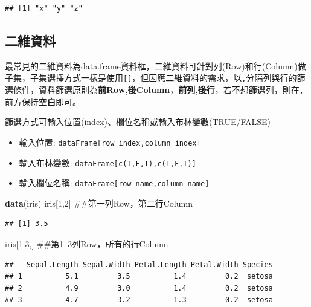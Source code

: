\documentclass[]{book}
\newenvironment{Shaded}{\begin{snugshade}}{\end{snugshade}}
\newcommand{\KeywordTok}[1]{\textcolor[rgb]{0.13,0.29,0.53}{\textbf{{#1}}}}
\newcommand{\DecValTok}[1]{\textcolor[rgb]{0.00,0.00,0.81}{{#1}}}
\newcommand{\NormalTok}[1]{{#1}}
\providecommand{\tightlist}{%
  \setlength{\itemsep}{0pt}\setlength{\parskip}{0pt}}
\theoremstyle{definition}
\theoremstyle{definition}
\theoremstyle{remark}
\begin{document}
\begin{verbatim}
## [1] "x" "y" "z"
\end{verbatim}

\subsection{二維資料}

最常見的二維資料為data.frame資料框，二維資料可針對列(Row)和行(Column)做子集，子集選擇方式一樣是使用\texttt{{[}{]}}，但因應二維資料的需求，以\texttt{,}分隔列與行的篩選條件，資料篩選原則為\textbf{前Row,後Column}，\textbf{前列,後行}，若不想篩選列，則在\texttt{,}前方保持\textbf{空白}即可。

篩選方式可輸入位置(index)、欄位名稱或輸入布林變數(TRUE/FALSE)

\begin{itemize}
\tightlist
\item
  輸入位置: \texttt{dataFrame{[}row\ index,column\ index{]}}
\item
  輸入布林變數: \texttt{dataFrame{[}c(T,F,T),c(T,F,T){]}}
\item
  輸入欄位名稱: \texttt{dataFrame{[}row\ name,column\ name{]}}
\end{itemize}

\begin{Shaded}
\begin{Highlighting}[]
\KeywordTok{data}\NormalTok{(iris)}
\NormalTok{iris[}\DecValTok{1}\NormalTok{,}\DecValTok{2}\NormalTok{] ##第一列Row，第二行Column}
\end{Highlighting}
\end{Shaded}

\begin{verbatim}
## [1] 3.5
\end{verbatim}

\begin{Shaded}
\begin{Highlighting}[]
\NormalTok{iris[}\DecValTok{1}\NormalTok{:}\DecValTok{3}\NormalTok{,] ##第1~3列Row，所有的行Column}
\end{Highlighting}
\end{Shaded}

\begin{verbatim}
##   Sepal.Length Sepal.Width Petal.Length Petal.Width Species
## 1          5.1         3.5          1.4         0.2  setosa
## 2          4.9         3.0          1.4         0.2  setosa
## 3          4.7         3.2          1.3         0.2  setosa
\end{verbatim}
\end{document}
